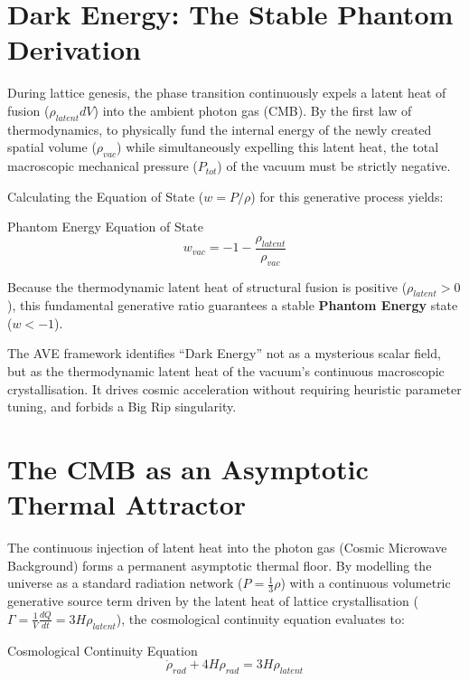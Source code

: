\section{Dark Energy: The Stable Phantom Derivation}

During lattice genesis, the phase transition continuously expels a latent heat of fusion
($\rho_{latent}dV$) into the ambient photon gas (CMB). By the first law of thermodynamics, to physically fund the internal energy of the newly created spatial volume ($\rho_{vac}$) while simultaneously
expelling this latent heat, the total macroscopic mechanical pressure ($P_{tot}$) of the vacuum
must be strictly negative.

Calculating the Equation of State ($w=P/\rho$) for this generative process yields:

\begin{resultbox}{Phantom Energy Equation of State}
\begin{equation}
w_{vac}=-1-\frac{\rho_{latent}}{\rho_{vac}}
\end{equation}
\end{resultbox}

Because the thermodynamic latent heat of structural fusion is positive ($\rho_{latent} > 0$), this fundamental generative ratio guarantees a stable \textbf{Phantom Energy} state ($w < -1$). 

The AVE framework identifies ``Dark Energy'' not as a mysterious scalar field, but as the
thermodynamic latent heat of the vacuum's continuous macroscopic crystallisation. It drives cosmic acceleration without requiring heuristic parameter tuning, and forbids a Big Rip singularity.

\section{The CMB as an Asymptotic Thermal Attractor}

The continuous injection of latent heat into the photon gas (Cosmic Microwave Background) forms a permanent asymptotic thermal floor. By modelling the universe as a standard radiation network ($P = \frac{1}{3}\rho$) with a continuous volumetric generative source term driven by the latent heat of lattice crystallisation ($\Gamma = \frac{1}{V}\frac{dQ}{dt} = 3H\rho_{latent}$), the cosmological continuity equation evaluates to:

\begin{resultbox}{Cosmological Continuity Equation}
\begin{equation}
\dot{\rho}_{rad} + 4H\rho_{rad} = 3H\rho_{latent}
\end{equation}
\end{resultbox}

